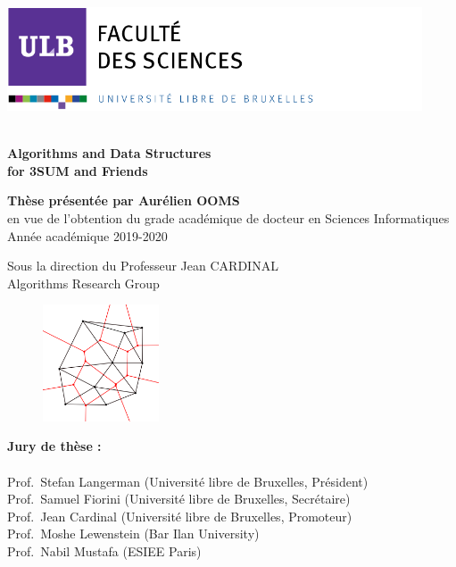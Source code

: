\documentclass[b5paper,12pt]{article}
\newcommand\blankpage{%
    \null
    \thispagestyle{empty}%
    \addtocounter{page}{-1}%
    \newpage}
\begin{document}
\includegraphics[width=12.3cm, height=3.07cm]{sciences.png} \\ \\

\begin{tcolorbox}
\color[rgb]{1,1,1}

\Large{\textbf{Algorithms and Data Structures\\ for 3SUM and Friends}}
\end{tcolorbox}

\begin{tcolorbox}[colback=white, halign=left]
\color{darkblue}
\large{\textbf{Thèse présentée par Aurélien OOMS}} \\
\color{black}
\small{en vue de l'obtention du grade académique de docteur en Sciences Informatiques \\
Année académique 2019-2020}

\vspace{2cm}

\begin{flushright}
\color{darkblue}
Sous la direction du Professeur Jean CARDINAL \\
\color{black}
Algorithms Research Group
\end{flushright}
\end{tcolorbox}
\vspace{4cm}


\begin{figure}
\includegraphics[width=3.45cm]{algorithms.png}
\end{figure}
\noindent
\textbf{Jury de thèse : } \\  \\
Prof.~Stefan Langerman (Université libre de Bruxelles, Président) \\
Prof.~Samuel Fiorini (Université libre de Bruxelles, Secrétaire) \\
Prof.~Jean Cardinal (Université libre de Bruxelles, Promoteur) \\
Prof.~Moshe Lewenstein (Bar Ilan University) \\
Prof.~Nabil Mustafa (ESIEE Paris) \\

\afterpage{\blankpage}
\end{document}
